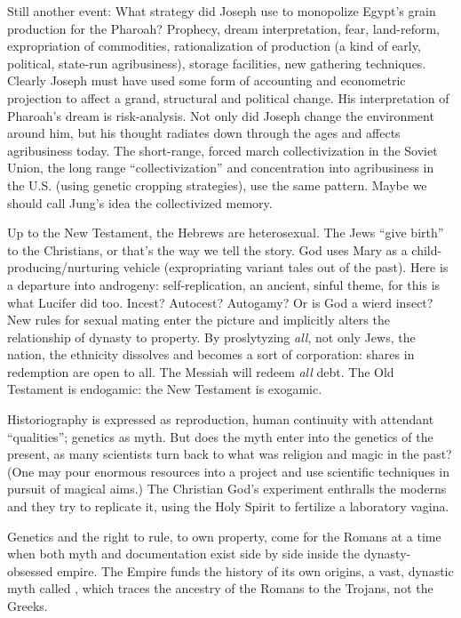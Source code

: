 Still another event: What strategy did
Joseph use to monopolize Egypt's grain production for the Pharoah? Prophecy, dream
interpretation, fear, land-reform, expropriation of commodities, rationalization of production (a kind of early, political, state-run
agribusiness), storage facilities, new gathering techniques. Clearly Joseph must have
used some form of accounting and econometric projection to affect a grand, structural
and political change. His interpretation of
Pharoah's dream is risk-analysis. Not only
did Joseph change the environment around
him, but his thought radiates down through
the ages and affects agribusiness today. The
short-range, forced march collectivization in
the Soviet Union, the long range \enquote{collectivization} and concentration into agribusiness
in the U.S. (using genetic cropping strategies), use the same pattern. Maybe we should
call Jung's idea the collectivized memory.

Up to the New Testament, the Hebrews are
heterosexual. The Jews \enquote{give birth} to the
Christians, or that's the way we tell the story.
God uses Mary as a child-producing\slash nurturing vehicle (expropriating variant tales out
of the past). Here is a departure into androgeny: self-replication, an ancient, sinful
theme, for this is what Lucifer did too. Incest? Autocest? Autogamy? Or is God a
wierd insect? New rules for sexual mating
enter the picture and implicitly alters the relationship of dynasty to property. By proslytyzing \emph{all}, not only Jews, the nation, the
ethnicity dissolves and becomes a sort of
corporation: shares in redemption are open
to all. The Messiah will redeem \emph{all} debt. The
Old Testament is endogamic: the New Testament is exogamic.

Historiography is expressed as reproduction, human continuity with attendant \enquote{qualities}; genetics as myth. But does the myth enter into the genetics of the present,
as many scientists turn back to what was religion and magic in the past? (One may pour
enormous resources into a project and use
scientific techniques in pursuit of magical
aims.) The Christian God's experiment enthralls the moderns and they try to replicate
it, using the Holy Spirit to fertilize a laboratory vagina.

Genetics and the right to rule, to own
property, come for the Romans at a time
when both myth and documentation exist
side by side inside the dynasty-obsessed
empire. The Empire funds the history of its
own origins, a vast, dynastic myth called
, which traces the ancestry of the
Romans to the Trojans, not the Greeks.

